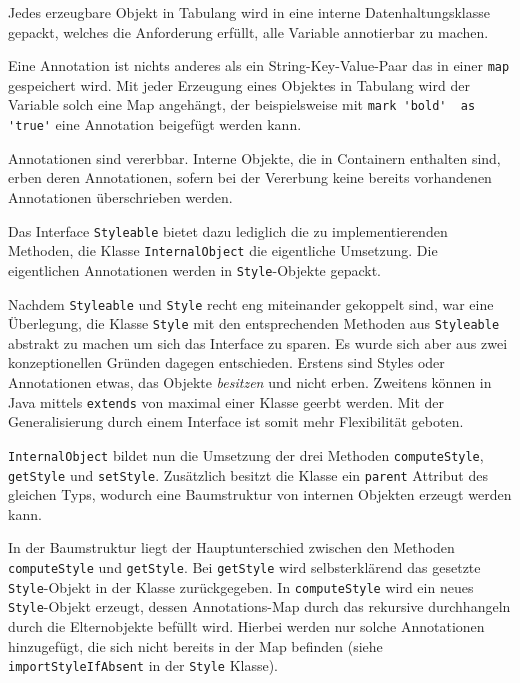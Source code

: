 Jedes erzeugbare Objekt in Tabulang wird
in eine interne Datenhaltungsklasse gepackt,
welches die Anforderung erfüllt, alle Variable annotierbar zu machen.

Eine Annotation ist nichts anderes als ein
String-Key-Value-Paar das in einer \lstinline{map} gespeichert wird.
Mit jeder Erzeugung eines Objektes in Tabulang
wird der Variable solch eine Map angehängt, der beispielsweise
mit \lstinline{mark 'bold'  as 'true'} eine Annotation beigefügt
werden kann.

Annotationen sind vererbbar. Interne Objekte, die in Containern
enthalten sind, erben deren Annotationen, sofern bei der Vererbung keine
bereits vorhandenen Annotationen überschrieben werden.

Das Interface \lstinline{Styleable} bietet dazu lediglich die zu
implementierenden Methoden, die Klasse \lstinline{InternalObject}
die eigentliche Umsetzung. Die eigentlichen Annotationen werden in
\lstinline{Style}-Objekte gepackt.

Nachdem \lstinline{Styleable} und \lstinline{Style} recht eng miteinander
gekoppelt sind, war eine Überlegung, die Klasse \lstinline{Style}
mit den entsprechenden Methoden aus \lstinline{Styleable} abstrakt zu
machen um sich das Interface zu sparen. Es wurde sich aber aus zwei
konzeptionellen Gründen dagegen entschieden. Erstens sind Styles oder Annotationen
etwas, das Objekte \textit{besitzen} und nicht erben. Zweitens
können in Java mittels \lstinline{extends} von maximal einer Klasse geerbt
werden. Mit der Generalisierung durch einem Interface ist somit
mehr Flexibilität geboten.

\lstinline{InternalObject} bildet nun die Umsetzung der drei Methoden
\lstinline{computeStyle}, \lstinline{getStyle} und \lstinline{setStyle}.
Zusätzlich besitzt die Klasse ein \lstinline{parent} Attribut des gleichen
Typs, wodurch eine Baumstruktur von internen Objekten erzeugt werden kann.

In der Baumstruktur liegt der Hauptunterschied zwischen den Methoden \lstinline{computeStyle}
und \lstinline{getStyle}. Bei \lstinline{getStyle} wird selbsterklärend das gesetzte
\lstinline{Style}-Objekt in der Klasse zurückgegeben. In \lstinline{computeStyle}
wird ein neues \lstinline{Style}-Objekt erzeugt, dessen Annotations-Map durch das
rekursive durchhangeln durch die Elternobjekte befüllt wird. Hierbei werden nur
solche Annotationen hinzugefügt, die sich nicht bereits in der Map befinden (siehe
\lstinline{importStyleIfAbsent} in der \lstinline{Style} Klasse).\\

